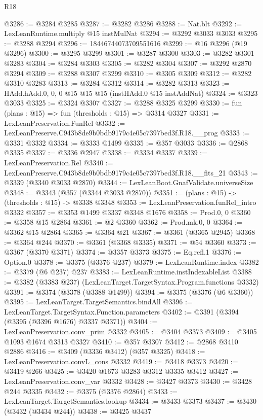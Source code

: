 \begin{lexlean}{R18}
\begin{coremodule}
{{{{{{{{{{{{{{{{{{{@3286 := @3284 @3285
@3287 := @3282 @3286
@3288 := Nat.blt
@3292 := LexLeanRuntime.multiply @15 instMulNat
@3294 := @3292 @3033 @3033
@3295 := @3288 @3294
@3296 := 18446744073709551616
@3299 := @16 @3296 (@19 @3296)
@3300 := @3295 @3299
@3301 := @3287 @3300
@3303 := @3282 @3301 @3283
@3304 := @3284 @3303
@3305 := @3282 @3304
@3307 := @3292 @2870 @3294
@3309 := @3288 @3307 @3299
@3310 := @3305 @3309
@3312 := @3282 @3310 @3283
@3313 := @3284 @3312
@3314 := @3282 @3313
@3323 := HAdd.hAdd.{0, 0, 0} @15 @15 @15 (instHAdd.{0} @15 instAddNat)
@3324 := @3323 @3033
@3325 := @3324 @3307
@3327 := @3288 @3325 @3299
@3330 := fun (plans : @15) => fun (thresholds : @15) => @3314 @3327
@3331 := LexLeanPreservation.FunRel
@3332 := LexLeanPreserve.C943b8de9b0bdb9179c4e05c7397bed3f.R18.__prog
@3333 := @3331 @3332
@3334 := @3333 @1499
@3335 := @357 @3033
@3336 := @2868 @3335
@3337 := @3336 @2947
@3338 := @3334 @3337
@3339 := LexLeanPreservation.Rel
@3340 := LexLeanPreserve.C943b8de9b0bdb9179c4e05c7397bed3f.R18.__fits_21
@3343 := @3339 (@3340 @3033 @2870)
@3344 := LexLeanBoot.GnafValidate.universeSize
@3348 := @3343 (@357 (@3344 @3033 @2870))
@3351 := (plans : @15) -> (thresholds : @15) -> @3338 @3348
@3353 := LexLeanPreservation.funRel_intro @3332
@3357 := @3353 @1499 @3337 @3348 @1676
@3358 := Prod.{0, 0}
@3360 := @3358 @15 @2864
@3361 := @2 @3360
@3362 := Prod.mk.{0, 0}
@3364 := @3362 @15 @2864
@3365 := @3364 @21
@3367 := @3361 (@3365 @2945)
@3368 := @3364 @244
@3370 := @3361 (@3368 @3335)
@3371 := @54 @3360
@3373 := @3367 (@3370 @3371)
@3374 := @3357 @3373
@3375 := Eq.refl.{1}
@3376 := Option.{0}
@3378 := @3375 (@3376 @237)
@3379 := LexLeanRuntime.index
@3382 := @3379 (@6 @237) @237
@3383 := LexLeanRuntime.instIndexableList
@3388 := @3382 (@3383 @237) (LexLeanTarget.TargetSyntax.Program.functions @3332)
@3391 := @3374 (@3378 (@3388 @1499))
@3394 := @3375 (@3376 (@6 @3360))
@3395 := LexLeanTarget.TargetSemantics.bindAll
@3396 := LexLeanTarget.TargetSyntax.Function.parameters
@3402 := @3391 (@3394 (@3395 (@3396 @1676) @3337 @3371))
@3404 := LexLeanPreservation.conv_prim @3332
@3405 := @3404 @3373
@3409 := @3405 @1093 @1674 @3313 @3327
@3410 := @357 @3307
@3412 := @2868 @3410 @2886
@3416 := @3409 (@3336 @3412) (@357 @3325)
@3418 := LexLeanPreservation.convL_cons @3332
@3419 := @3418 @3373
@3420 := @3419 @266
@3425 := @3420 @1673 @3283 @3312 @3335 @3412
@3427 := LexLeanPreservation.conv_var @3332
@3428 := @3427 @3373
@3430 := @3428 @244 @3335
@3432 := @3375 (@3376 @2864)
@3433 := LexLeanTarget.TargetSemantics.lookup
@3434 := @3433 @3373
@3437 := @3430 (@3432 (@3434 @244))
@3438 := @3425 @3437
}}}}}}}}}}}}}}}}}}}
\end{coremodule}
\end{lexlean}

